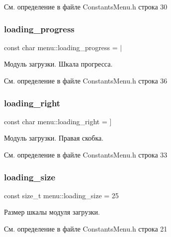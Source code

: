 См. определение в файле Constants\+Menu.\+h строка 30

\mbox{\label{namespacemenu_ab79f369195d81dcb241b1ab5269c9d3d}} 
\subsubsection{\texorpdfstring{loading\+\_\+progress}{loading\_progress}}
{\footnotesize\ttfamily const char menu\+::loading\+\_\+progress = \textquotesingle{}$\vert$\textquotesingle{}}

Модуль загрузки. Шкала прогресса. 

См. определение в файле Constants\+Menu.\+h строка 36

\mbox{\label{namespacemenu_a272b2c0c591457b2aeccaae0c122a1fc}} 
\subsubsection{\texorpdfstring{loading\+\_\+right}{loading\_right}}
{\footnotesize\ttfamily const char menu\+::loading\+\_\+right = \textquotesingle{}\mbox{]}\textquotesingle{}}

Модуль загрузки. Правая скобка. 

См. определение в файле Constants\+Menu.\+h строка 33

\mbox{\label{namespacemenu_aa3bc0d7f62e04dc52dd8f276902448ae}} 
\subsubsection{\texorpdfstring{loading\+\_\+size}{loading\_size}}
{\footnotesize\ttfamily const size\+\_\+t menu\+::loading\+\_\+size = 25}

Размер шкалы модуля загрузки. 

См. определение в файле Constants\+Menu.\+h строка 21

